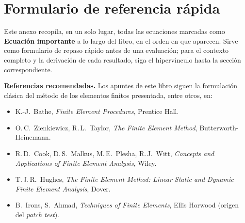\chapter{Formulario de referencia rápida}
\label{anexo:formulario}

Este anexo recopila, en un solo lugar, todas las ecuaciones marcadas como \textcolor{ucred}{\textbf{Ecuación importante}} a lo largo del libro, en el orden en que aparecen. Sirve como formulario de repaso rápido antes de una evaluación; para el contexto completo y la derivación de cada resultado, siga el hipervínculo hasta la sección correspondiente.


\bigskip
\noindent\textbf{Referencias recomendadas.} Los apuntes de este libro siguen la formulación clásica del método de los elementos finitos presentada, entre otros, en:
\begin{itemize}[leftmargin=1.4em]
  \item K.-J.\ Bathe, \emph{Finite Element Procedures}, Prentice Hall.
  \item O.\,C.\ Zienkiewicz, R.\,L.\ Taylor, \emph{The Finite Element Method}, Butterworth-Heinemann.
  \item R.\,D.\ Cook, D.\,S.\ Malkus, M.\,E.\ Plesha, R.\,J.\ Witt, \emph{Concepts and Applications of Finite Element Analysis}, Wiley.
  \item T.\,J.\,R.\ Hughes, \emph{The Finite Element Method: Linear Static and Dynamic Finite Element Analysis}, Dover.
  \item B.\ Irons, S.\ Ahmad, \emph{Techniques of Finite Elements}, Ellis Horwood (origen del \emph{patch test}).
\end{itemize}
